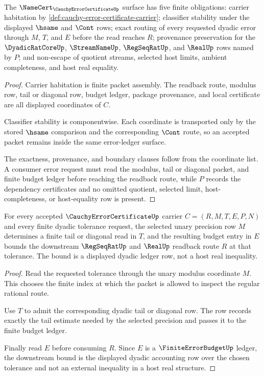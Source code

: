 \begin{theorem}
\label{thm:cauchy-error-certificate-namecert-obligations}
The $\NameCert_{\CauchyErrorCertificateUp}$ surface has five finite obligations: carrier habitation by \autoref{def:cauchy-error-certificate-carrier}; classifier stability under the displayed $\hsame$ and $\Cont$ rows; exact routing of every requested dyadic error through $M$, $T$, and $E$ before the read reaches $R$; provenance preservation for the $\DyadicRatCoreUp$, $\StreamNameUp$, $\RegSeqRatUp$, and $\RealUp$ rows named by $P$; and non-escape of quotient streams, selected host limits, ambient completeness, and host real equality.
\end{theorem}
\begin{proof}
Carrier habitation is finite packet assembly. The readback route, modulus row, tail or diagonal row, budget ledger, package provenance, and local certificate are all displayed coordinates of $C$.

Classifier stability is componentwise. Each coordinate is transported only by the stored $\hsame$ comparison and the corresponding $\Cont$ route, so an accepted packet remains inside the same error-ledger surface.

The exactness, provenance, and boundary clauses follow from the coordinate list. A consumer error request must read the modulus, tail or diagonal packet, and finite budget ledger before reaching the readback route, while $P$ records the dependency certificates and no omitted quotient, selected limit, host-completeness, or host-equality row is present.
\end{proof}

\begin{theorem}
\label{thm:cauchy-error-certificate-modulus-soundness}
For every accepted $\CauchyErrorCertificateUp$ carrier $C=(R,M,T,E,P,N)$ and every finite dyadic tolerance request, the selected unary precision row $M$ determines a finite tail or diagonal read in $T$, and the resulting budget entry in $E$ bounds the downstream $\RegSeqRatUp$ and $\RealUp$ readback route $R$ at that tolerance. The bound is a displayed dyadic ledger row, not a host real inequality.
\end{theorem}
\begin{proof}
Read the requested tolerance through the unary modulus coordinate $M$. This chooses the finite index at which the packet is allowed to inspect the regular rational route.

Use $T$ to admit the corresponding dyadic tail or diagonal row. The row records exactly the tail estimate needed by the selected precision and passes it to the finite budget ledger.

Finally read $E$ before consuming $R$. Since $E$ is a $\FiniteErrorBudgetUp$ ledger, the downstream bound is the displayed dyadic accounting row over the chosen tolerance and not an external inequality in a host real structure.
\end{proof}

